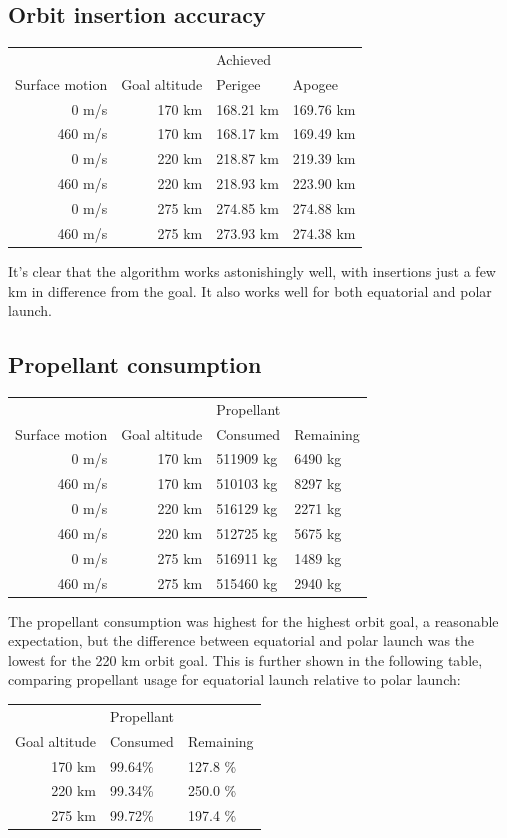\documentclass[11pt]{article}
\begin{document}
\subsection{Orbit insertion accuracy}
\begin{center}
  \begin{tabular}{ r | r  | l  l  }
     &   &  Achieved  \\
    Surface motion & Goal altitude & Perigee & Apogee \\
    \hline
    0 m/s & 170 km & 168.21 km & 169.76 km \\
    460 m/s & 170 km & 168.17 km & 169.49 km \\
    \hline
    0 m/s & 220 km & 218.87 km & 219.39 km \\
    460 m/s & 220 km  & 218.93 km & 223.90 km \\
    \hline
    0 m/s & 275 km & 274.85 km & 274.88 km \\
    460 m/s & 275 km & 273.93 km & 274.38 km
  \end{tabular}
\end{center}
It's clear that the algorithm works astonishingly well, with insertions just a few km in difference from the goal. It also works well for both equatorial and polar launch.

\subsection{Propellant consumption}
\begin{center}
  \begin{tabular}{ r | r  | l  l  }
     &   &   Propellant   \\
    Surface motion &  Goal altitude & Consumed & Remaining \\
    \hline
    0 m/s & 170 km & 511909 kg & 6490 kg \\
    460 m/s & 170 km & 510103 kg & 8297 kg \\
    \hline
    0 m/s & 220 km & 516129 kg & 2271 kg \\
    460 m/s & 220 km  & 512725 kg & 5675 kg \\
    \hline
    0 m/s & 275 km & 516911 kg & 1489 kg \\
    460 m/s & 275 km & 515460 kg & 2940 kg
  \end{tabular}
\end{center}
The propellant consumption was highest for the highest orbit goal, a reasonable expectation, but the difference between equatorial and polar launch was the lowest for the 220 km orbit goal.
This is further shown in the following table, comparing propellant usage for equatorial launch relative to polar launch:
\begin{center}
  \begin{tabular}{ r | l  l  }
     &   Propellant   \\
    Goal altitude & Consumed & Remaining \\
    \hline
    170 km & 99.64\% & 127.8 \% \\
    220 km & 99.34\% & 250.0 \% \\
    275 km & 99.72\% & 197.4 \%
  \end{tabular}
\end{center}
\end{document}
